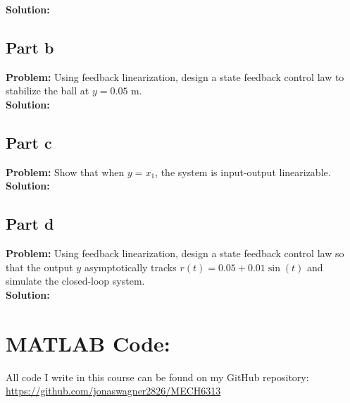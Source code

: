\documentclass[letter]{article}
\numberwithin{equation}{section}
\begin{document}
\noindent
\textbf{Solution:}








\subsection{Part b}
\textbf{Problem:}
Using feedback linearization, design a state feedback control law to stabilize the ball at $y = 0.05$ m.\\

\noindent
\textbf{Solution:}










\subsection{Part c}
\textbf{Problem:}
Show that when $y = x_1$, the system is input-output linearizable.\\

\noindent
\textbf{Solution:}







\subsection{Part d}
\textbf{Problem:}
Using feedback linearization, design a state feedback control law so that the output $y$ asymptotically tracks $r(t) = 0.05 + 0.01 \sin(t)$ and simulate the closed-loop system.\\

\noindent
\textbf{Solution:}











\newpage
\appendix
\section{MATLAB Code:}\label{apx:matlab}
All code I write in this course can be found on my GitHub repository:\\
\href{https://github.com/jonaswagner2826/MECH6313}{https://github.com/jonaswagner2826/MECH6313}
%
\end{document}

